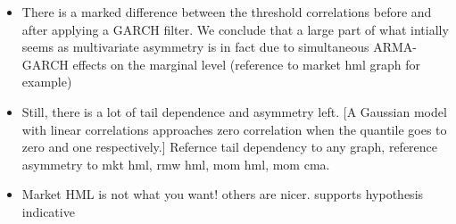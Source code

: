 \begin{itemize}
  \item There is a marked difference between the threshold correlations before and after applying a GARCH filter. We conclude that a large part of what intially seems as multivariate asymmetry is in fact due to simultaneous ARMA-GARCH effects on the marginal level (reference to market hml graph for example)
  \item Still, there is a lot of tail dependence and asymmetry left. [A Gaussian model with linear correlations approaches zero correlation when the quantile goes to zero and one respectively.] Refernce tail dependency to any graph, reference asymmetry to mkt hml, rmw hml, mom hml, mom cma. 
  \item Market HML is not what you want! others are nicer. supports hypothesis indicative  
\end{itemize}
